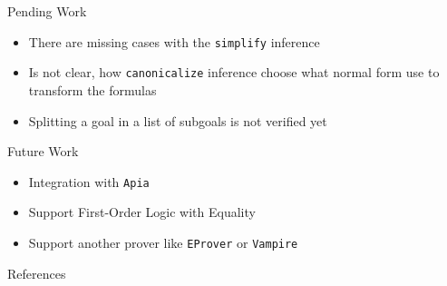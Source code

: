 \documentclass[xetex, hyperref={pdfpagelabels=false}]{beamer}
\begin{document}
\begin{frame}[label=pending-work]{Pending Work}
\begin{itemize}
\item There are missing cases with the \texttt{simplify} inference
\item Is not clear, how  \texttt{canonicalize} inference choose what
normal form use to transform the formulas
\item Splitting a goal in a list of subgoals is not verified yet
\end{itemize}
\end{frame}

\begin{frame}[label=future-work]{Future Work}
\begin{itemize}
  \item Integration with \texttt{Apia}
  \item Support First-Order Logic with Equality
  \item Support another prover like \texttt{EProver} or \texttt{Vampire}
\end{itemize}
\end{frame}

\begin{frame}
\end{frame}

\begin{frame}[label=references]{References}
\printbibliography
\end{frame}
\end{document}
